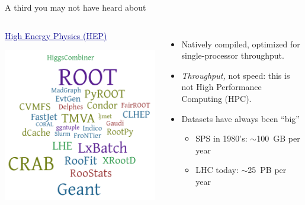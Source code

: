\documentclass[aspectratio=169]{beamer}
\begin{document}
\begin{frame}{A third you may not have heard about}
\vspace{0.25 cm}
\begin{columns}
\begin{center}
\textcolor{darkblue}{\Large \underline{High Energy Physics (HEP)}}

\vspace{0.25 cm}
\includegraphics[height=6 cm]{hep-software.png}
\end{center}

\begin{itemize}
\item Natively compiled, optimized for single-processor throughput.
\item<2-> {\it Throughput,} not speed: this is not High Performance Computing (HPC).
\item<3-> Datasets have always been ``big'' 
\begin{itemize}
\item<3-> SPS in 1980's: $\sim$100~GB per year
\item<4-> LHC today: $\sim$25~PB per year
\end{itemize}
\end{itemize}


\end{columns}
\end{frame}
\end{document}
